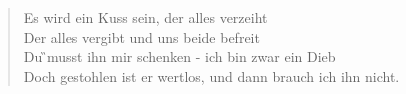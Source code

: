 \documentclass[9pt,a4paper,oneside, onecolumn]{article}
\begin{document}
\begin{small}
\begin{verse}
Es \Em{}wird ein Kuss sein, der \Hm{}alles verzeiht\\
Der \Am{}alles vergibt und uns \C{}beide befreit\\
Du \G{}musst ihn mir schenken - ich \D{}bin zwar ein Dieb\\
Doch \F{}gestohlen ist er wertlos, und dann brauch ich ihn \C{}nicht.\\
\end{verse}

\end{small}
\end{document}
